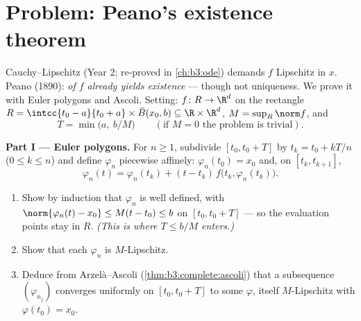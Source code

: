 \section{Problem: Peano's existence theorem}

\begin{problem}[{Weekend problem --- existence of solutions of
$x' = f(t, x)$ without Lipschitz}]\label{pb:b3:complete:1}
Cauchy--Lipschitz (Year 2; re-proved in \cref{ch:b3:ode})
demands $f$ Lipschitz in $x$. Peano (1890): \emph{ of
$f$ already yields existence} --- though not uniqueness. We
prove it with Euler polygons and Ascoli. Setting: $f \colon R
\to \R^d$  on the rectangle $R = \intcc{t_0 - a}{t_0
+ a}\times \bar B(x_0, b) \subseteq \R\times\R^d$, $M =
\sup_R\norm f$, and
\[
T = \min\bigl(a,\ b/M\bigr)
\qquad (\text{if } M = 0 \text{ the problem is trivial}).
\]

\medskip
\noindent\textbf{Part I --- Euler polygons.} For $n \geq 1$,
subdivide $[t_0, t_0 + T]$ by $t_k = t_0 + kT/n$ ($0 \leq k
\leq n$) and define $\varphi_n$ piecewise affinely:
$\varphi_n(t_0) = x_0$ and, on $[t_k, t_{k+1}]$,
\[
\varphi_n(t) = \varphi_n(t_k) + (t -
t_k)\,f\bigl(t_k, \varphi_n(t_k)\bigr).
\]
\begin{enumerate}
  \item Show by induction that $\varphi_n$ is well defined,
        with $\norm{\varphi_n(t) - x_0} \leq M(t - t_0) \leq b$
        on $[t_0, t_0 + T]$ --- so the evaluation points stay
        in $R$. \emph{(This is where $T \leq b/M$ enters.)}
  \item Show that each $\varphi_n$ is $M$-Lipschitz.
  \item Deduce from Arzel\`a--Ascoli
        (\cref{thm:b3:complete:ascoli}) that a subsequence
        $(\varphi_{n_j})$ converges uniformly on $[t_0, t_0 +
        T]$ to some $\varphi$, itself $M$-Lipschitz with
        $\varphi(t_0) = x_0$.
\end{enumerate}


\end{problem}
